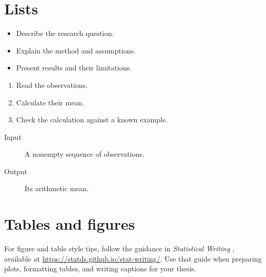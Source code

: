 \section{Lists}
\begin{itemize}
  \item Describe the research question.
  \item Explain the method and assumptions.
  \item Present results and their limitations.
\end{itemize}
\begin{enumerate}
  \item Read the observations.
  \item Calculate their mean.
  \item Check the calculation against a known example.
\end{enumerate}
\begin{description}
  \item[Input] A nonempty sequence of observations.
  \item[Output] Its arithmetic mean.
\end{description}


\section{Tables and figures}
For figure and table style tips, follow the guidance in
\emph{Statistical Writing} \citep{schifano2026statistical}, available at
\url{https://statds.github.io/stat-writing/}. Use that guide when preparing
plots, formatting tables, and writing captions for your thesis.


